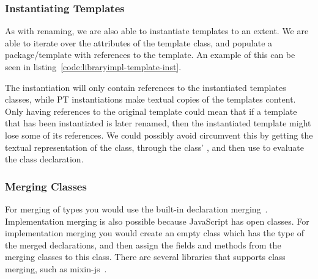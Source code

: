 \subsubsection{Instantiating Templates}\label{subsubsec:instantiating-templates}

As with renaming, we are also able to instantiate templates to an extent.
We are able to iterate over the attributes of the template class, and populate a package/template with references to the template.
An example of this can be seen in listing~\vref{code:libraryimpl-template-inst}.


The instantiation will only contain references to the instantiated templates classes, while PT instantiations make textual copies of the templates content.
Only having references to the original template could mean that if a template that has been instantiated is later renamed, then the instantiated template might lose some of its references.
We could possibly avoid circumvent this by getting the textual representation of the class, through the class' , and then use  to evaluate the class declaration.

\subsubsection{Merging Classes}

For merging of types you would use the built-in declaration merging~\cite{declerationmerging}.
Implementation merging is also possible because JavaScript has open classes.
For implementation merging you would create an empty class which has the type of the merged declarations, and then assign the fields and methods from the merging classes to this class.
There are several libraries that supports class merging, such as mixin-js~\cite{mixinjs}.

